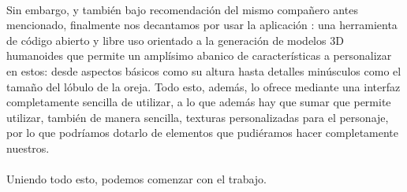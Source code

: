 \documentclass{subfiles}
\begin{document}
    \paragraph{}
    Sin embargo, y también bajo recomendación del mismo compañero antes mencionado, finalmente nos decantamos por usar la aplicación \makehuman \cite{web:makehuman}: una herramienta de código abierto y libre uso orientado a la generación de modelos 3D humanoides que permite un amplísimo abanico de características a personalizar en estos: desde aspectos básicos como su altura hasta detalles minúsculos como el tamaño del lóbulo de la oreja. Todo esto, además, lo ofrece mediante una interfaz completamente sencilla de utilizar, a lo que además hay que sumar que permite utilizar, también de manera sencilla, texturas personalizadas para el personaje, por lo que podríamos dotarlo de elementos que pudiéramos hacer completamente nuestros.

    \paragraph{}
    Uniendo todo esto, podemos comenzar con el trabajo.
    
\end{document}
